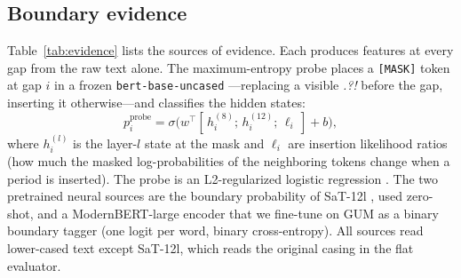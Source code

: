\subsection{Boundary evidence}
\label{sec:evidence}
Table~\ref{tab:evidence} lists the sources of evidence. Each produces features at every gap from the raw text alone.
The maximum-entropy probe places a \texttt{[MASK]} token at gap $i$ in a frozen \texttt{bert-base-uncased}
\citep{devlin-etal-2019-bert}---replacing a visible \emph{.?!} before the gap, inserting it otherwise---and classifies the
hidden states:
\begin{equation}
  p^{\text{probe}}_i = \sigma\big(w^{\top} [\,h^{(8)}_i;\, h^{(12)}_i;\, \ell_i\,] + b\big),
  \label{eq:probe}
\end{equation}
where $h^{(l)}_i$ is the layer-$l$ state at the mask and $\ell_i$ are insertion likelihood ratios (how much the masked
log-probabilities of the neighboring tokens change when a period is inserted). The probe is an L2-regularized logistic
regression \citep{alain-bengio-2016-understanding}. The two pretrained neural sources are the boundary probability of
SaT-12l \citep{frohmann-etal-2024-segment}, used zero-shot, and a ModernBERT-large encoder
\citep{warner-etal-2024-modernbert} that we fine-tune on GUM as a binary boundary tagger (one logit per word, binary
cross-entropy). All sources read lower-cased text except SaT-12l, which reads the original casing in the flat evaluator.

\begin{table}[t]
  \centering
  \small
  \setlength{\tabcolsep}{3pt}
  \caption{Evidence sources (number of features in parentheses). Rules and $n$-gram counts are fitted on GUM train only;
  details in App.~\ref{app:method}.}
  \label{tab:evidence}
\end{table}


